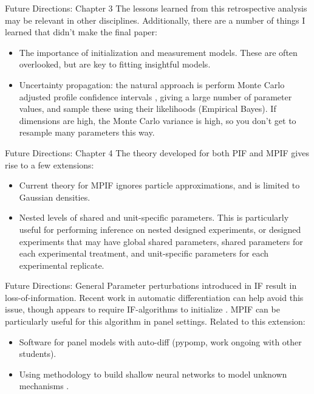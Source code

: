 \documentclass[aspectratio=169]{beamer}\usepackage[]{graphicx}\usepackage[]{xcolor}
\begin{document}
  \begin{frame}{Future Directions: Chapter 3}
    The lessons learned from this retrospective analysis may be relevant in other disciplines.
    Additionally, there are a number of things I learned that didn't make the final paper: 
    \begin{itemize}
      \item The importance of initialization and measurement models. These are often overlooked, but are key to fitting insightful models.
      \item Uncertainty propagation: the natural approach is perform Monte Carlo adjusted profile confidence intervals \citep{ionides17}, giving a large number of parameter values, and sample these using their likelihoods (Empirical Bayes). If dimensions are high, the Monte Carlo variance is high, so you don't get to resample many parameters this way. 
    \end{itemize}
  \end{frame}
  
  \begin{frame}{Future Directions: Chapter 4}
    The theory developed for both PIF and MPIF gives rise to a few extensions: 
    \begin{itemize}
      \item Current theory for MPIF ignores particle approximations, and is limited to Gaussian densities.
      \item Nested levels of shared and unit-specific parameters. This is particularly useful for performing inference on nested designed experiments, or designed experiments that may have global shared parameters, shared parameters for each experimental treatment, and unit-specific parameters for each experimental replicate.
    \end{itemize}
  \end{frame}
    
    \begin{frame}{Future Directions: General}
      Parameter perturbations introduced in IF result in loss-of-information. Recent work in automatic differentiation can help avoid this issue, though appears to require IF-algorithms to initialize \citep{tan24}. MPIF can be particularly useful for this algorithm in panel settings. Related to this extension: 
      \begin{itemize}
        \item Software for panel models with auto-diff (pypomp, work ongoing with other students).
        \item Using methodology to build shallow neural networks to model unknown mechanisms \citep[e.g.,][]{noordijk24}. 
      \end{itemize}
  \end{frame}
\end{document}

